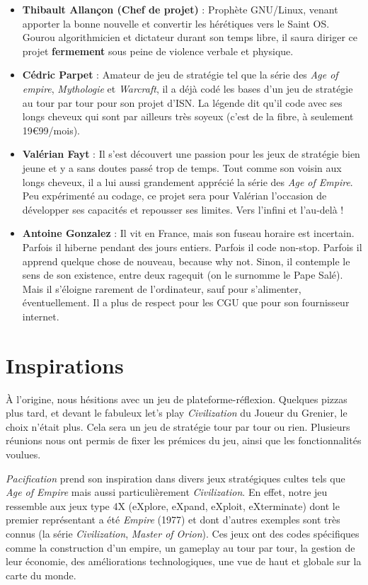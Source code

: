 \documentclass[12pt]{report}
\begin{document}
\begin{itemize}[label=\textbullet]
    \item \textbf{Thibault Allançon (Chef de projet)} : Prophète GNU/Linux, venant apporter la bonne nouvelle et convertir les hérétiques vers le Saint OS. Gourou algorithmicien et dictateur durant son temps libre, il saura diriger ce projet \textbf{fermement} sous peine de violence verbale et physique. 
    \item \textbf{Cédric Parpet} : Amateur de jeu de stratégie tel que la série des \textit{Age of empire}, \textit{Mythologie} et \textit{Warcraft}, il a déjà codé les bases d’un jeu de stratégie au tour par tour pour son projet d’ISN. La légende dit qu’il code avec ses longs cheveux qui sont par ailleurs très soyeux (c’est de la fibre, à seulement 19\euro99/mois).
    \item \textbf{Valérian Fayt} : Il s’est découvert une passion pour les jeux de stratégie bien jeune et y a sans doutes passé trop de temps. Tout comme son voisin aux longs cheveux, il a lui aussi grandement apprécié la série des \textit{Age of Empire}. Peu expérimenté au codage, ce projet sera pour Valérian l’occasion de développer ses capacités et repousser ses limites. Vers l’infini et l’au-delà !
    \item \textbf{Antoine Gonzalez} : Il vit en France, mais son fuseau horaire est incertain. Parfois il hiberne pendant des jours entiers. Parfois il code non-stop. Parfois il apprend quelque chose de nouveau, because why not. Sinon, il contemple le sens de son existence, entre deux ragequit (on le surnomme le Pape Salé). Mais il s’éloigne rarement de l’ordinateur, sauf pour s’alimenter, éventuellement. Il a plus de respect pour les CGU que pour son fournisseur internet.
\end{itemize}

\section{Inspirations}

À l’origine, nous hésitions avec un jeu de plateforme-réflexion. Quelques pizzas plus tard, et devant le fabuleux let’s play \textit{Civilization} du Joueur du Grenier, le choix n’était plus. Cela sera un jeu de stratégie tour par tour ou rien. Plusieurs réunions nous ont permis de fixer les prémices du jeu, ainsi que les fonctionnalités voulues.

\textit{Pacification} prend son inspiration dans divers jeux stratégiques cultes tels que \textit{Age of Empire} mais aussi particulièrement \textit{Civilization}. En effet, notre jeu ressemble aux jeux type 4X (eXplore, eXpand, eXploit, eXterminate) dont le premier représentant a été \textit{Empire} (1977) et dont d’autres exemples sont très connus (la série \textit{Civilization}, \textit{Master of Orion}). Ces jeux ont des codes spécifiques comme la construction d’un empire, un gameplay au tour par tour, la gestion de leur économie, des améliorations technologiques, une vue de haut et globale sur la carte du monde.
\end{document}
